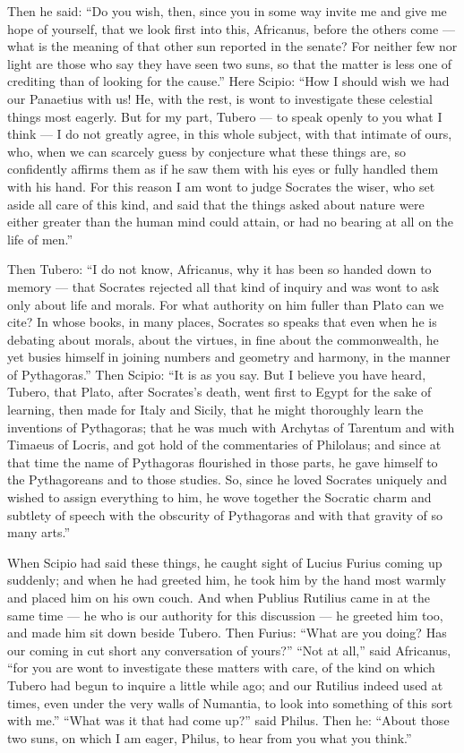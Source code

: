  Then he said: ``Do you wish, then, since you in some way invite me and give me hope of yourself, that we look first into this, Africanus, before the others come --- what is the meaning of that other sun reported in the senate? For neither few nor light are those who say they have seen two suns, so that the matter is less one of crediting than of looking for the cause.'' Here Scipio: ``How I should wish we had our Panaetius with us! He, with the rest, is wont to investigate these celestial things most eagerly. But for my part, Tubero --- to speak openly to you what I think --- I do not greatly agree, in this whole subject, with that intimate of ours, who, when we can scarcely guess by conjecture what these things are, so confidently affirms them as if he saw them with his eyes or fully handled them with his hand. For this reason I am wont to judge Socrates the wiser, who set aside all care of this kind, and said that the things asked about nature were either greater than the human mind could attain, or had no bearing at all on the life of men.''

 Then Tubero: ``I do not know, Africanus, why it has been so handed down to memory --- that Socrates rejected all that kind of inquiry and was wont to ask only about life and morals. For what authority on him fuller than Plato can we cite? In whose books, in many places, Socrates so speaks that even when he is debating about morals, about the virtues, in fine about the commonwealth, he yet busies himself in joining numbers and geometry and harmony, in the manner of Pythagoras.'' Then Scipio: ``It is as you say. But I believe you have heard, Tubero, that Plato, after Socrates's death, went first to Egypt for the sake of learning, then made for Italy and Sicily, that he might thoroughly learn the inventions of Pythagoras; that he was much with Archytas of Tarentum and with Timaeus of Locris, and got hold of the commentaries of Philolaus; and since at that time the name of Pythagoras flourished in those parts, he gave himself to the Pythagoreans and to those studies. So, since he loved Socrates uniquely and wished to assign everything to him, he wove together the Socratic charm and subtlety of speech with the obscurity of Pythagoras and with that gravity of so many arts.''

 When Scipio had said these things, he caught sight of Lucius Furius coming up suddenly; and when he had greeted him, he took him by the hand most warmly and placed him on his own couch. And when Publius Rutilius came in at the same time --- he who is our authority for this discussion --- he greeted him too, and made him sit down beside Tubero. Then Furius: ``What are you doing? Has our coming in cut short any conversation of yours?'' ``Not at all,'' said Africanus, ``for you are wont to investigate these matters with care, of the kind on which Tubero had begun to inquire a little while ago; and our Rutilius indeed used at times, even under the very walls of Numantia, to look into something of this sort with me.'' ``What was it that had come up?'' said Philus. Then he: ``About those two suns, on which I am eager, Philus, to hear from you what you think.''

